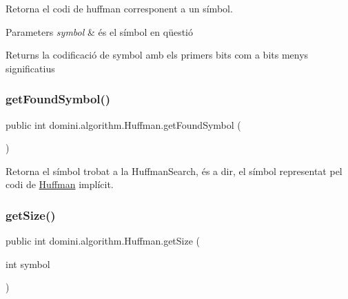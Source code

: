 Retorna el codi de huffman corresponent a un símbol. 


\begin{DoxyParams}{Parameters}
{\em symbol} & és el símbol en qüestió \\
\hline
\end{DoxyParams}
\begin{DoxyReturn}{Returns}
la codificació de symbol amb els primers bits com a bits menys significatius 
\end{DoxyReturn}
\mbox{\label{classdomini_1_1algorithm_1_1Huffman_a2fa5805057243c65769bf12435e5f363}} 
\subsubsection{\texorpdfstring{get\+Found\+Symbol()}{getFoundSymbol()}}
{\footnotesize\ttfamily public int domini.\+algorithm.\+Huffman.\+get\+Found\+Symbol (\begin{DoxyParamCaption}{ }\end{DoxyParamCaption})\hspace{0.3cm}{\ttfamily [inline]}}



Retorna el símbol trobat a la Huffman\+Search, és a dir, el símbol representat pel codi de \hyperlink{classdomini_1_1algorithm_1_1Huffman}{Huffman} implícit. 

\mbox{\label{classdomini_1_1algorithm_1_1Huffman_a2791541d1b5a3d65912fad5979d41dfd}} 
\subsubsection{\texorpdfstring{get\+Size()}{getSize()}}
{\footnotesize\ttfamily public int domini.\+algorithm.\+Huffman.\+get\+Size (\begin{DoxyParamCaption}\item[{int}]{symbol }\end{DoxyParamCaption})\hspace{0.3cm}{\ttfamily [inline]}}



